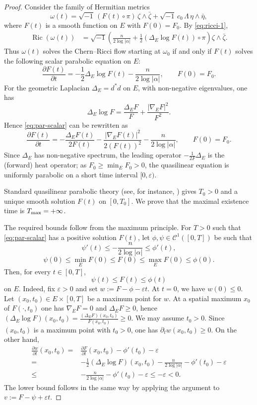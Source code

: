 \documentclass[12pt]{amsart}
\numberwithin{equation}{section}
\theoremstyle{remark}
\theoremstyle{definition}
\begin{document}
\begin{proof}
Consider the family of Hermitian metrics
$$ \omega(t) = \sqrt{-1}\, (F(t)\circ\pi)\, \zeta\wedge\bar\zeta + \sqrt{-1}\, c_0\, \Lambda\, \eta\wedge\bar\eta, $$
where $F(t)$ is a smooth function on $E$ with $F(0)=F_0$.
By \eqref{eq:ricci-1},
\begin{align*}
\operatorname{Ric}(\omega(t))
&=\sqrt{-1}\left(\frac{n}{2\log|\alpha|}+\frac12(\Delta_E\log F(t))\circ\pi\right)\zeta\wedge\bar\zeta.
\end{align*}
Thus $\omega(t)$ solves the Chern--Ricci flow starting at $\omega_0$ if and only if $F(t)$ solves the following scalar parabolic equation on $E$:
\begin{equation}\label{eq:par-scalar}
\frac{\partial F(t)}{\partial t} = - \frac{1}{2}\Delta_E \log F(t) - \frac{n}{2\log|\alpha|}, \qquad F(0)=F_0.
\end{equation}
For the geometric Laplacian $\Delta_E=d^{*}d$ on $E$, with non-negative eigenvalues, one has
$$\Delta_E\log F=\frac{\Delta_EF}{F}+\frac{|\nabla_EF|^2}{F^2}.$$
Hence \eqref{eq:par-scalar} can be rewritten as
$$ \frac{\partial F(t)}{\partial t}
= -\frac{\Delta_E F(t)}{2F(t)}
- \frac{|\nabla_E F(t)|^2}{2(F(t))^2}
- \frac{n}{2\log|\alpha|}, \qquad F(0)=F_0. $$
Since $\Delta_E$ has non-negative spectrum, the leading operator $-\tfrac{1}{2F}\Delta_E$ is the (forward) heat operator; as $F_0 \geq \min_E F_0>0$, the quasilinear equation is uniformly parabolic on a short time interval $[0,\varepsilon)$.

Standard quasilinear parabolic theory (see, for instance, \cite{lieberman, LSU}) gives $T_0>0$ and a unique smooth solution $F(t)$ on $[0,T_0]$. We prove that the maximal existence time is $T_{\rm max}=+\infty$.

The required bounds follow from the maximum principle. For $T>0$ such that \eqref{eq:par-scalar} has a positive solution $F(t)$, let $\phi,\psi \in \mathcal C^1([0,T])$ be such that
$$ \psi'(t) \leq -\frac{n}{2\log|\alpha|} \leq \phi'(t), $$
$$ \psi(0) \leq \min_E F(0) \leq F(0) \leq \max_E F(0) \leq \phi(0). $$
Then, for every $t \in [0,T]$,
$$ \psi(t) \leq F(t) \leq \phi(t) $$
on $E$. Indeed, fix $\varepsilon>0$ and set $w:=F-\phi-\varepsilon t$. At $t=0$, we have $w(0)\leq 0$. Let $(x_0,t_0)\in E \times [0,T]$ be a maximum point for $w$.
At a spatial maximum $x_0$ of $F(\cdot,t_0)$ one has $\nabla_E F=0$ and $\Delta_E F\ge0$, hence
$(\Delta_E\log F)(x_0,t_0)=\frac{(\Delta_E F)(x_0,t_0)}{F(x_0,t_0)}\ge0$.
We may assume $t_0>0$. Since $(x_0,t_0)$ is a maximum point with $t_0>0$, one has $\partial_t w(x_0,t_0)\geq0$. On the other hand,
\begin{align*}
\frac{\partial w}{\partial t}(x_0,t_0)
=& \frac{\partial F}{\partial t}(x_0,t_0) - \phi'(t_0) - \varepsilon \\
=& - \frac{1}{2} (\Delta_E\log F)(x_0,t_0) - \frac{n}{2\log|\alpha|} - \phi'(t_0) - \varepsilon\\
\leq& - \frac{n}{2\log|\alpha|} - \phi'(t_0) - \varepsilon \leq -\varepsilon<0.
\end{align*}
The lower bound follows in the same way by applying the argument to $v:=F-\psi+\varepsilon t$.


\end{proof}
\end{document}
